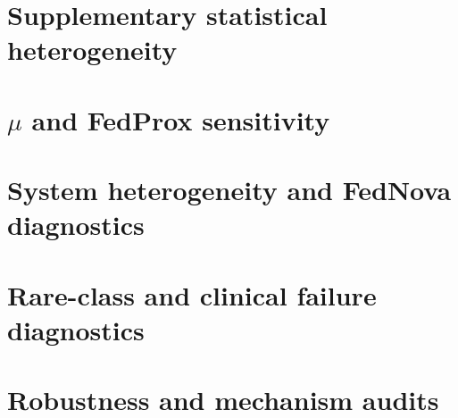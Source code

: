 \documentclass[11pt,a4paper]{report}
\begin{document}
\chapter{Supplementary statistical heterogeneity}
\label{app:stat-het}

\chapter{$\mu$ and FedProx sensitivity}
\label{app:mu-sensitivity}

\chapter{System heterogeneity and FedNova diagnostics}
\label{app:system-het}

\chapter{Rare-class and clinical failure diagnostics}
\label{app:clinical}

\chapter{Robustness and mechanism audits}
\label{app:robustness}
\end{document}
